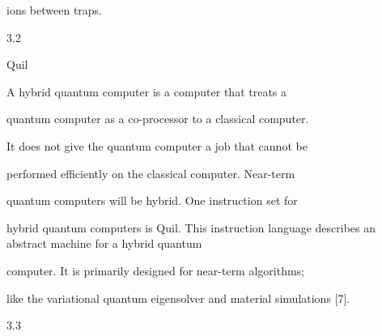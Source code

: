 \documentclass[a4paper,portrait,12pt]{article}
\begin{document}
\begin{flushleft}
ions between traps.
\end{flushleft}





3.2





\begin{flushleft}
Quil
\end{flushleft}





\begin{flushleft}
A hybrid quantum computer is a computer that treats a
\end{flushleft}


\begin{flushleft}
quantum computer as a co-processor to a classical computer.
\end{flushleft}


\begin{flushleft}
It does not give the quantum computer a job that cannot be
\end{flushleft}


\begin{flushleft}
performed efficiently on the classical computer. Near-term
\end{flushleft}


\begin{flushleft}
quantum computers will be hybrid. One instruction set for
\end{flushleft}


\begin{flushleft}
hybrid quantum computers is Quil. This instruction language describes an abstract machine for a hybrid quantum
\end{flushleft}


\begin{flushleft}
computer. It is primarily designed for near-term algorithms;
\end{flushleft}


\begin{flushleft}
like the variational quantum eigensolver and material simulations [7].
\end{flushleft}





3.3
\end{document}
